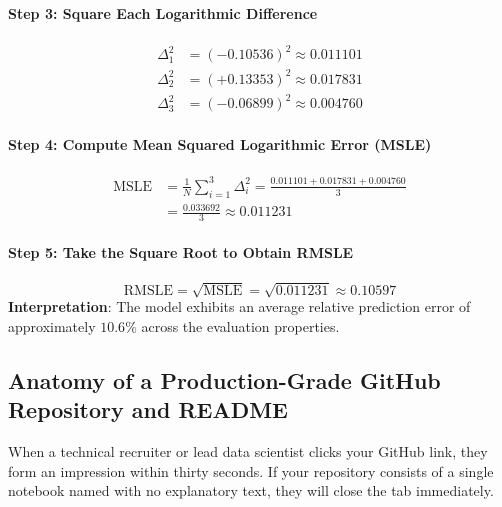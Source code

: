 \begin{example}
\paragraph{Step 3: Square Each Logarithmic Difference}
\begin{align*}
\Delta_1^2 &= (-0.10536)^2 \approx \mathbf{0.011101} \\
\Delta_2^2 &= (+0.13353)^2 \approx \mathbf{0.017831} \\
\Delta_3^2 &= (-0.06899)^2 \approx \mathbf{0.004760}
\end{align*}

\paragraph{Step 4: Compute Mean Squared Logarithmic Error (MSLE)}
\begin{align*}
\text{MSLE} &= \frac{1}{N} \sum_{i=1}^3 \Delta_i^2 = \frac{0.011101 + 0.017831 + 0.004760}{3} \\
&= \frac{0.033692}{3} \approx \mathbf{0.011231}
\end{align*}

\paragraph{Step 5: Take the Square Root to Obtain RMSLE}
\begin{equation*}
\text{RMSLE} = \sqrt{\text{MSLE}} = \sqrt{0.011231} \approx \mathbf{0.10597}
\end{equation*}
\textbf{Interpretation}: The model exhibits an average relative prediction error of approximately $10.6\%$ across the evaluation properties.
\end{example}

\subsection{Anatomy of a Production-Grade GitHub Repository and README}\label{subsec:github_readme}

When a technical recruiter or lead data scientist clicks your GitHub link, they form an impression within thirty seconds. If your repository consists of a single notebook named  with no explanatory text, they will close the tab immediately.

